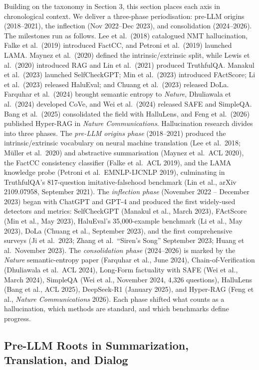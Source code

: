 Building on the taxonomy in Section 3, this section places each axis in chronological context. We deliver a three-phase periodisation: pre-LLM origins (2018--2021), the inflection (Nov 2022--Dec 2023), and consolidation (2024--2026). The milestones run as follows. Lee et al.~(2018) catalogued NMT hallucination, Falke et al.~(2019) introduced FactCC, and Petroni et al.~(2019) launched LAMA. Maynez et al.~(2020) defined the intrinsic/extrinsic split, while Lewis et al.~(2020) introduced RAG and Lin et al.~(2021) produced TruthfulQA. Manakul et al.~(2023) launched SelfCheckGPT; Min et al.~(2023) introduced FActScore; Li et al.~(2023) released HaluEval; and Chuang et al.~(2023) released DoLa. Farquhar et al.~(2024) brought semantic entropy to \emph{Nature}, Dhuliawala et al.~(2024) developed CoVe, and Wei et al.~(2024) released SAFE and SimpleQA. Bang et al.~(2025) consolidated the field with HalluLens, and Feng et al.~(2026) published Hyper-RAG in \emph{Nature Communications}. Hallucination research divides into three phases. The \emph{pre-LLM origins phase} (2018--2021) produced the intrinsic/extrinsic vocabulary on neural machine translation (Lee et al.~2018; Müller et al.~2020) and abstractive summarisation (Maynez et al.~ACL 2020), the FactCC consistency classifier (Falke et al.~ACL 2019), and the LAMA knowledge probe (Petroni et al.~EMNLP-IJCNLP 2019), culminating in TruthfulQA's 817-question imitative-falsehood benchmark (Lin et al., arXiv 2109.07958, September 2021). The \emph{inflection phase} (November 2022 -- December 2023) began with ChatGPT and GPT-4 and produced the first widely-used detectors and metrics: SelfCheckGPT (Manakul et al., March 2023), FActScore (Min et al., May 2023), HaluEval's 35,000-example benchmark (Li et al., May 2023), DoLa (Chuang et al., September 2023), and the first comprehensive surveys (Ji et al.~2023; Zhang et al.~``Siren's Song'' September 2023; Huang et al.~November 2023). The \emph{consolidation phase} (2024--2026) is marked by the \emph{Nature} semantic-entropy paper (Farquhar et al., June 2024), Chain-of-Verification (Dhuliawala et al.~ACL 2024), Long-Form factuality with SAFE (Wei et al., March 2024), SimpleQA (Wei et al., November 2024, 4,326 questions), HalluLens (Bang et al., ACL 2025), DeepSeek-R1 (January 2025), and Hyper-RAG (Feng et al., \emph{Nature Communications} 2026). Each phase shifted what counts as a hallucination, which methods are standard, and which benchmarks define progress.

\subsection{Pre-LLM Roots in Summarization, Translation, and Dialog}\label{pre-llm-roots-in-summarization-translation-and-dialog}

